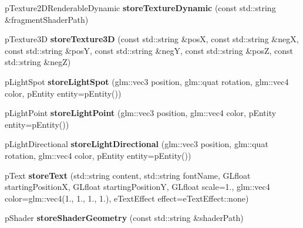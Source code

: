 \begin{DoxyCompactItemize}
\item 
\hypertarget{classfillwave_1_1Engine_a8defb3db1fc8882f967c012a79afeff0}{}p\+Texture2\+D\+Renderable\+Dynamic {\bfseries store\+Texture\+Dynamic} (const std\+::string \&fragment\+Shader\+Path)\label{classfillwave_1_1Engine_a8defb3db1fc8882f967c012a79afeff0}

\item 
\hypertarget{classfillwave_1_1Engine_a3c3207e65c948a73ddb07021687c4a35}{}p\+Texture3\+D {\bfseries store\+Texture3\+D} (const std\+::string \&pos\+X, const std\+::string \&neg\+X, const std\+::string \&pos\+Y, const std\+::string \&neg\+Y, const std\+::string \&pos\+Z, const std\+::string \&neg\+Z)\label{classfillwave_1_1Engine_a3c3207e65c948a73ddb07021687c4a35}

\item 
\hypertarget{classfillwave_1_1Engine_acef6ad430f102bca3d6975c4a2c3f17a}{}p\+Light\+Spot {\bfseries store\+Light\+Spot} (glm\+::vec3 position, glm\+::quat rotation, glm\+::vec4 color, p\+Entity entity=p\+Entity())\label{classfillwave_1_1Engine_acef6ad430f102bca3d6975c4a2c3f17a}

\item 
\hypertarget{classfillwave_1_1Engine_a46cb84111218f318dbc2f1143f4ee277}{}p\+Light\+Point {\bfseries store\+Light\+Point} (glm\+::vec3 position, glm\+::vec4 color, p\+Entity entity=p\+Entity())\label{classfillwave_1_1Engine_a46cb84111218f318dbc2f1143f4ee277}

\item 
\hypertarget{classfillwave_1_1Engine_a3b70a285ba9d5e912d71e1ba504b2880}{}p\+Light\+Directional {\bfseries store\+Light\+Directional} (glm\+::vec3 position, glm\+::quat rotation, glm\+::vec4 color, p\+Entity entity=p\+Entity())\label{classfillwave_1_1Engine_a3b70a285ba9d5e912d71e1ba504b2880}

\item 
\hypertarget{classfillwave_1_1Engine_a96be4bcbb09810e004ca585fde819b68}{}p\+Text {\bfseries store\+Text} (std\+::string content, std\+::string font\+Name, G\+Lfloat starting\+Position\+X, G\+Lfloat starting\+Position\+Y, G\+Lfloat scale=1., glm\+::vec4 color=glm\+::vec4(1., 1., 1., 1.), e\+Text\+Effect effect=e\+Text\+Effect\+::none)\label{classfillwave_1_1Engine_a96be4bcbb09810e004ca585fde819b68}

\item 
\hypertarget{classfillwave_1_1Engine_a0597b16a02320880925f66a85dddd154}{}p\+Shader {\bfseries store\+Shader\+Geometry} (const std\+::string \&shader\+Path)\label{classfillwave_1_1Engine_a0597b16a02320880925f66a85dddd154}


\end{DoxyCompactItemize}
